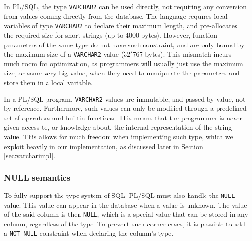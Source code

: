 \documentclass[twoside,11pt,a4paper]{article}
\newcommand{\pls}[1]{\small\texttt{#1}\normalsize}
\newcommand{\plstype}[1]{\pls{#1}}
\newcommand{\varchar}{\plstype{VARCHAR2}}
\newcommand{\plsnull}{\pls{NULL}}
\newcommand{\notnull}{\pls{NOT NULL}}
\begin{document}
In PL/SQL, the type \varchar{} can be used directly, not requiring any conversion from values coming directly from the database. The language requires local variables of type \varchar{} to declare their maximum length, and pre-allocates the required size for short strings (up to 4000 bytes). However, function parameters of the same type do not have such constraint, and are only bound by the maximum size of a \varchar{} value ($32'767$ bytes). This mismatch incurs much room for optimization, as programmers will usually just use the maximum size, or some very big value, when they need to manipulate the parameters and store them in a local variable.

In a PL/SQL program, \varchar{} values are immutable, and passed by value, not by reference. Furthermore, such values can only be modified through a predefined set of operators and builtin functions. This means that the programmer is never given access to, or knowledge about, the internal representation of the string value. This allows for much freedom when implementing such type, which we exploit heavily in our implementation, as discussed later in Section \ref{sec:varcharimpl}.

\subsubsection{NULL semantics}

\label{sec:nullsemantics}


To fully support the type system of SQL, PL/SQL must also handle the \plsnull{} value. This value can appear in the database when a value is unknown. The value of the said column is then \plsnull{}, which is a special value that can be stored in any column, regardless of the type. To prevent such corner-cases, it is possible to add a \notnull{} constraint when declaring the column's type.
\end{document}
